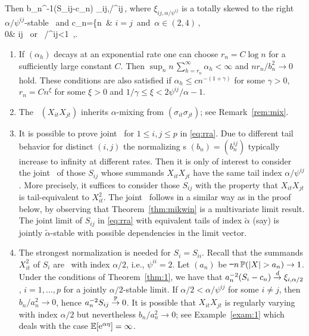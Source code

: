Then 
\beam\label{eq:rra}
b_n^{-1}(S_{ij}-c_n) \std \xi_{ij,\alpha/\psi^{ij}}\,,
\eeam
where $\xi_{ij,\alpha/\psi^{ij}}$ is a totally skewed to the right $\alpha/\psi^{ij}$-stable \rv\ and 
\beao
c_n=\left\{n\, \E [X^2]& \mbox{$i=j$ and $\alpha\in (2,4)$}\,,\\
0& i\ne j \mbox{ or } \alpha/\psi^{ij}<1 \,,\earr\right.
\eeao
\ethe
\bre\label{reM:c1}
\begin{enumerate}
\item
If $(\alpha_h)$ decays  at an exponential rate one can choose $r_n= C\log n$ for a sufficiently large constant $C$. Then
  $\sup _n n\,\sum_{h=r_n}^\infty \alpha_h<\infty$ and $nr_n/b_n^2\to 0$ hold. These conditions are also satisfied if
$\alpha_h\le c n^{-(1+\gamma)}$ for some $\gamma>0$, $r_n=C n^\xi$  for some
$\xi>0$ and $1/\gamma\le \xi< 2\psi^{ij}/\alpha-1$.
\item
The \seq\ $(X_{it}X_{jt})$ inherits $\alpha$-mixing from $(\sigma_{it}\sigma_{jt})$; see Remark~\ref{rem:mix}.
\item It is possible to prove joint \con\ for $1\le i,j\le p$ in \eqref{eq:rra}. Due to different tail behavior for
distinct $(i,j)$ the normalizing \seq s $(b_n)=(b_n^{ij})$ typically increase to infinity at different rates. Then it is only of interest
to consider the joint \con\ of those $S_{ij}$ whose summands $X_{it}X_{jt}$ have the same tail index $\alpha/\psi^{ ij}$. More
precisely, it suffices to consider those $S_{ij}$ with the property that $X_{it}X_{jt}$ is tail-equivalent to $X_{it}^2$. 
The joint \con\ follows in a similar way as in the proof below, by observing
that Theorem~\ref{thm:mikwin} is a multivariate limit result. 
The joint limit of $S_{ij}$ in \eqref{eq:rra} with equivalent tails of index $\tilde{\alpha}$ (say) is
jointly $\tilde{\alpha}$-stable with possible dependencies in the limit vector. 
\item
The strongest normalization is needed for $S_i=S_{ii}$. Recall that the summands $X_{it}^2$ of $S_i$ are \regvary\ with index 
$\alpha/2$, i.e., $\psi^{ii}=2$. Let $(a_n)$ be \st\ $n\,\P(|X|>a_n)\to 1$.
Under the conditions of Theorem~\ref{thm:1}, we have that $a_n^{-2}(S_i-c_n)\stackrel{d}{\rightarrow} \xi_{i,\alpha/2}$, $i=1,\ldots,p$ 
for a jointly $\alpha/2$-stable limit.  If
$\alpha/2<\alpha/\psi^{ij}$ for some $i\ne j$, then $b_n/a_n^2\to 0$, hence $a_n^{-2} S_{ij}\stackrel{{\mathbb P}}{\rightarrow} 0$. It is possible that $X_{it}X_{jt}$
is regularly varying with index $\alpha/2$ but nevertheless $b_n/a_n^2\to 0$; see Example~\ref{exam:1} 
which deals with the case ${\mathbb E} [{\rm e}^{\alpha \eta}]=\infty$.
\end{enumerate}
